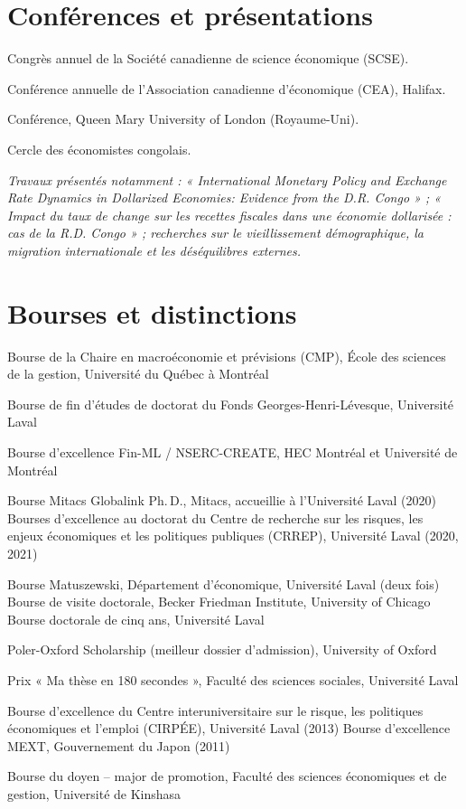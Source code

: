 \documentclass[11pt,letterpaper]{article}
\newenvironment{datelist}
  {\begin{description}[style=multiline,leftmargin=2.75cm,labelwidth=2.55cm,
     labelsep=0.2cm,font=\normalfont\small\color{soft},
     itemsep=0.45em,topsep=0.25em,parsep=0.15em]}
  {\end{description}}
\newcommand{\dotsep}{\;\textcolor{soft}{\textbullet}\;}
\newcommand{\meta}[1]{{\small\itshape\color{soft}#1}}
\begin{document}
\section{Conférences et présentations}
\begin{tight}
  \item Congrès annuel de la Société canadienne de science économique (SCSE).
  \item Conférence annuelle de l'Association canadienne d'économique (CEA), Halifax.
  \item Conférence, Queen Mary University of London (Royaume-Uni).
  \item Cercle des économistes congolais.
\end{tight}
\meta{Travaux présentés notamment : « International Monetary Policy and Exchange Rate Dynamics in Dollarized Economies: Evidence from the D.R. Congo » ; « Impact du taux de change sur les recettes fiscales dans une économie dollarisée : cas de la R.D. Congo » ; recherches sur le vieillissement démographique, la migration internationale et les déséquilibres externes.}
\section{Bourses et distinctions}
\begin{datelist}
  \item[2025] Bourse de la Chaire en macroéconomie et prévisions (CMP), École des sciences de la gestion, Université du Québec à Montréal
  \item[2023] Bourse de fin d'études de doctorat du Fonds Georges-Henri-Lévesque, Université Laval
  \item[2022] Bourse d'excellence Fin-ML / NSERC-CREATE, HEC Montréal et Université de Montréal
  \item[2020--2021] Bourse Mitacs Globalink Ph.\,D., Mitacs, accueillie à l'Université Laval (2020) \dotsep Bourses d'excellence au doctorat du Centre de recherche sur les risques, les enjeux économiques et les politiques publiques (CRREP), Université Laval (2020, 2021)
  \item[2019] Bourse Matuszewski, Département d'économique, Université Laval (deux fois) \dotsep Bourse de visite doctorale, Becker Friedman Institute, University of Chicago \dotsep Bourse doctorale de cinq ans, Université Laval
  \item[2016] Poler-Oxford Scholarship (meilleur dossier d'admission), University of Oxford
  \item[2014] Prix « Ma thèse en 180 secondes », Faculté des sciences sociales, Université Laval
  \item[2011--2013] Bourse d'excellence du Centre interuniversitaire sur le risque, les politiques économiques et l'emploi (CIRPÉE), Université Laval (2013) \dotsep Bourse d'excellence MEXT, Gouvernement du Japon (2011)
  \item[2010] Bourse du doyen -- major de promotion, Faculté des sciences économiques et de gestion, Université de Kinshasa
\end{datelist}
\end{document}
